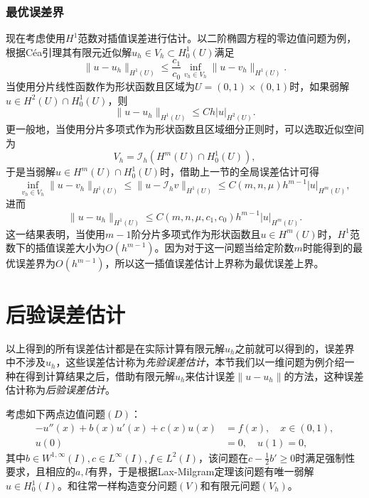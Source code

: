 \documentclass[a4paper,10pt]{ctexart}
\begin{document}
\subsubsection{最优误差界}
现在考虑使用$ H^1 $范数对插值误差进行估计。以二阶椭圆方程的零边值问题为例，根据Céa引理其有限元近似解$ u_h\in V_h\subset H^1_0(U) $满足
\begin{equation}
    \| u-u_h \|_{H^1(U)} \leqslant \frac{c_1}{c_0}\inf_{v_h\in V_h} \| u-v_h \|_{H^1(U)}.
\end{equation}
当使用分片线性函数作为形状函数且区域为$ U=(0,1)\times (0,1) $时，如果弱解$ u\in H^2(U)\cap H^1_0(U) $，则
\[
    \| u-u_h \|_{H^1(U)} \leqslant C h | u |_{H^2(U)}.
\]
更一般地，当使用分片多项式作为形状函数且区域细分正则时，可以选取近似空间为
\[
    V_h = \mathcal{I}_h(H^m(U)\cap H^1_0(U)),
\]
于是当弱解$ u\in H^m(U)\cap H^1_0(U) $时，借助上一节的全局误差估计可得
\begin{equation}
    \inf_{v_h\in V_h} \| u-v_h \|_{H^1(U)} \leqslant \| u-\mathcal{I}_hv \|_{H^1(U)}\leqslant C(m,n,\mu) h^{m-1} | u |_{H^m(U)},
\end{equation}
进而
\begin{equation}
    \| u-u_h \|_{H^1(U)} \leqslant C(m,n,\mu,c_1,c_0) h^{m-1} | u |_{H^m(U)}.
\end{equation}
这一结果表明，当使用$ m-1 $阶分片多项式作为形状函数且$ u\in H^m(U) $时，$ H^1 $范数下的插值误差大小为$ O(h^{m-1}) $。因为对于这一问题当给定阶数$ m $时能得到的最优误差界为$ O(h^{m-1}) $，所以这一插值误差估计上界称为最优误差上界。

\section{后验误差估计}
以上得到的所有误差估计都是在实际计算有限元解$ u_h $之前就可以得到的，误差界中不涉及$ u_h $，这些误差估计称为\emph{先验误差估计}，本节我们以一维问题为例介绍一种在得到计算结果之后，借助有限元解$ u_h $来估计误差$ \| u-u_h \| $的方法，这种误差估计称为\emph{后验误差估计}。

考虑如下两点边值问题$ (D) $：
\[
    \begin{aligned}
        -u''(x) + b(x)u'(x) + c(x)u(x) &= f(x),\quad x\in (0,1),\\
        u(0) &= 0,\quad u(1) = 0,
    \end{aligned}  
\]
其中$ b\in W^{1,\infty}(I),c\in L^\infty(I),f\in L^2(I) $，该问题在$ c-\frac{1}{2}b'\geqslant 0 $时满足强制性要求，且相应的$ a,l $有界，于是根据Lax-Milgram定理该问题有唯一弱解$ u\in H^1_0(I) $。和往常一样构造变分问题$ (V) $和有限元问题$ (V_h) $。
\end{document}
